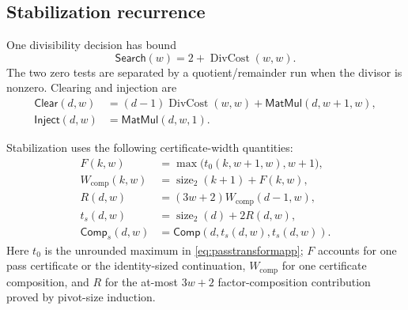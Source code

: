 \documentclass[11pt]{article}
\theoremstyle{definition}
\newcommand{\natsize}{\operatorname{size}_2}
\newcommand{\DivCost}{\operatorname{DivCost}}
\begin{document}
\subsection{Stabilization recurrence}

One divisibility decision has bound
\begin{equation}
 \mathsf{Search}(w)=2+\DivCost(w,w).
 \label{eq:searchbound}
\end{equation}
The two zero tests are separated by a quotient/remainder run when the divisor is nonzero.  Clearing and injection are
\begin{align}
 \mathsf{Clear}(d,w)&=(d-1)\DivCost(w,w)
       +\mathsf{MatMul}(d,w+1,w),\label{eq:clearbound}\\
 \mathsf{Inject}(d,w)&=\mathsf{MatMul}(d,w,1).
 \label{eq:injectbound}
\end{align}

Stabilization uses the following certificate-width quantities:
\begin{align}
 F(k,w)&=\max\bigl(t_0(k,w+1,w),w+1\bigr),\label{eq:stabfactor}\\
 W_{\mathrm{comp}}(k,w)&=\natsize(k+1)+F(k,w),\label{eq:stabcompositionwidth}\\
 R(d,w)&=(3w+2)W_{\mathrm{comp}}(d-1,w),\label{eq:stabtransformwidth}\\
 t_s(d,w)&=\natsize(d)+2R(d,w),\label{eq:stabexecwidth}\\
 \mathsf{Comp}_s(d,w)&=\mathsf{Comp}(d,t_s(d,w),t_s(d,w)).
 \label{eq:stabcompcost}
\end{align}
Here $t_0$ is the unrounded maximum in \eqref{eq:passtransformapp}; $F$ accounts for one pass certificate or the identity-sized continuation, $W_{\mathrm{comp}}$ for one certificate composition, and $R$ for the at-most $3w+2$ factor-composition contribution proved by pivot-size induction.
\end{document}
